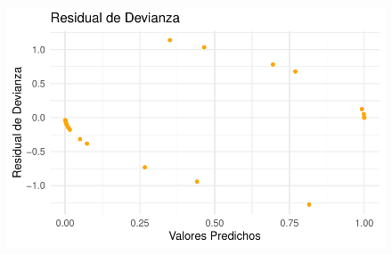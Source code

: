 \documentclass[
  letterpaper,
  DIV=11,
  numbers=noendperiod]{scrartcl}
\begin{document}
\begin{figure}
%
\begin{minipage}{0.50\linewidth}
\includegraphics{Modelos_files/figure-pdf/unnamed-chunk-55-4.pdf}\end{minipage}%

\end{figure}%
\end{document}
